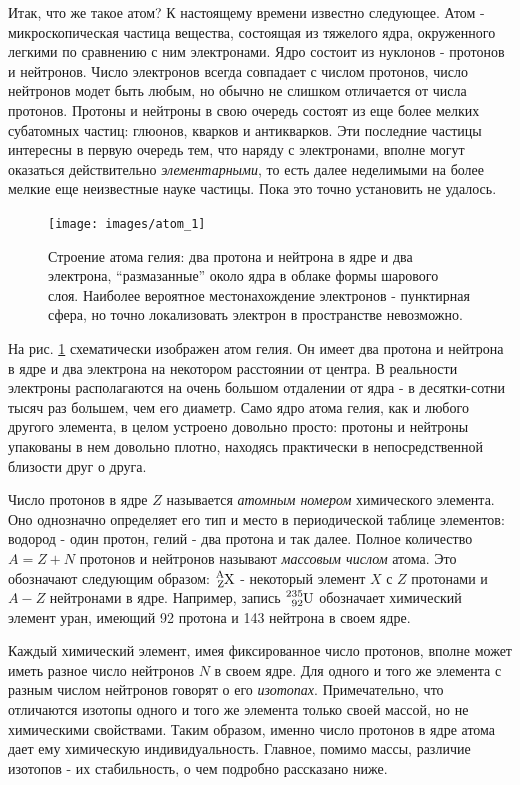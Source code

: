 Итак, что же такое атом? К настоящему времени известно следующее.
Атом - микроскопическая частица вещества, состоящая из тяжелого ядра, окруженного легкими по сравнению с ним электронами.
Ядро состоит из нуклонов - протонов и нейтронов.
Число электронов всегда совпадает с числом протонов, число нейтронов модет быть любым, но обычно не слишком отличается от числа протонов. 
Протоны и нейтроны в свою очередь состоят из еще более мелких субатомных частиц: глюонов, кварков и антикварков.
Эти последние частицы интересны в первую очередь тем, что наряду с электронами, вполне могут оказаться действительно \textit{элементарными}, то есть далее неделимыми на более мелкие еще неизвестные науке частицы.
Пока это точно установить не удалось.

\begin{figure}[t!]
   \centering
   \texttt{[image: images/atom\_1]}
   \caption{Строение атома гелия: два протона и нейтрона в ядре и два электрона, ``размазанные'' около ядра в облаке формы шарового слоя. Наиболее вероятное местонахождение электронов - пунктирная сфера, но точно локализовать электрон в пространстве невозможно.}
   \label{fig:atom_1}
\end{figure}

На рис. \ref{fig:atom_1} схематически изображен атом гелия.
Он имеет два протона и нейтрона в ядре и два электрона на некотором расстоянии от центра.
В реальности электроны располагаются на очень большом отдалении от ядра - в десятки-сотни тысяч раз большем, чем его диаметр.
Само ядро атома гелия, как и любого другого элемента, в целом устроено довольно просто: протоны и нейтроны упакованы в нем довольно плотно, находясь практически в непосредственной близости друг о друга.

Число протонов в ядре $Z$ называется \textit{атомным номером} химического элемента.
Оно однозначно определяет его тип и место в периодической таблице элементов: водород - один протон, гелий - два протона и так далее.
Полное количество $A = Z + N$ протонов и нейтронов называют \textit{массовым числом} атома.
Это обозначают следующим образом: $\ce{^{A}_{Z}X}$ - некоторый элемент $X$ с $Z$ протонами и $A - Z$ нейтронами в ядре.  
Например, запись $\ce{^{235}_{92}U}$ обозначает химический элемент уран, имеющий 92 протона и 143 нейтрона в своем ядре.

Каждый химический элемент, имея фиксированное число протонов, вполне может иметь разное число нейтронов $N$ в своем ядре.
Для одного и того же элемента с разным числом нейтронов говорят о его \textit{изотопах}.
Примечательно, что отличаются изотопы одного и того же элемента только своей массой, но не химическими свойствами.
Таким образом, именно число протонов в ядре атома дает ему химическую индивидуальность.
Главное, помимо массы, различие изотопов - их стабильность, о чем подробно рассказано ниже.

